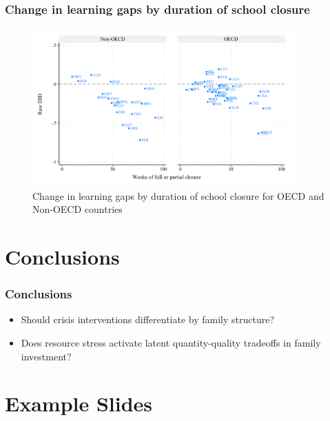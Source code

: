 \documentclass{beamer}
\begin{document}
\begin{frame}
    \label{frame:pisaclosure}
    \frametitle{Change in learning gaps by duration of school closure}
    
    \begin{figure}
        \centering
        \includegraphics[width=0.9\textwidth]{./FIGURES/Descriptive/PISA_raw_DID_PV4MATH_not_fully_open.pdf}
        \caption{Change in learning gaps by duration of school closure for OECD and Non-OECD countries}
        \label{fig:1b}
    \end{figure}
    
    
\end{frame}





\section{Conclusions}

\begin{frame}
    \label{frame:conclusions}
    \frametitle{Conclusions}
    \begin{itemize}
        \item Should crisis interventions differentiate by family structure?
        \item Does resource stress activate latent quantity-quality tradeoffs in family investment?
    \end{itemize}


\end{frame}

\section{Example Slides}
\end{document}
